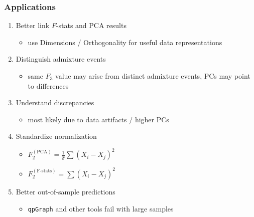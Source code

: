 \documentclass[11pt]{beamer}
\begin{document}
\begin{frame}
\frametitle{Applications}
\begin{enumerate}
	\item <1->Better link $F$-stats and PCA results
		\begin{itemize}
			\item<1-> use Dimensions / Orthogonality for useful data representations
		\end{itemize}	
 	\item<2-> Distinguish admixture events
\begin{itemize}
	\item<3-> same $F_3$ value may arise from distinct admixture events, PCs may point to differences
\end{itemize}
\item<4-> Understand discrepancies
\begin{itemize}
	\item<4-> most likely due to data artifacts / higher PCs
\end{itemize}	
	\item <5->Standardize normalization 
	\begin{itemize}
		\item <5->$F_2^{(\text{PCA})} = \frac{1}{\hat\sigma}\sum(X_i - X_j)^2$
		\item <5->$F_2^{(\text{F-stats})} = \sum(X_i - X_j)^2$		
	\end{itemize}
    \item<7-> Better out-of-sample predictions
\begin{itemize}
	\item<7-> \texttt{qpGraph} and other tools fail with large samples
\end{itemize}
    
\end{enumerate}
\end{frame}
\end{document}
